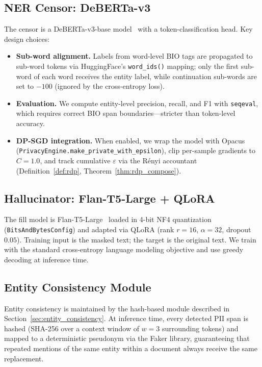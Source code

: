 \documentclass[11pt, a4paper]{article}
\begin{document}
\subsection{NER Censor: DeBERTa-v3}

The censor is a DeBERTa-v3-base model~\cite{he2021debertav3} with a
token-classification head.  Key design choices:
\begin{itemize}
  \item \textbf{Sub-word alignment.}  Labels from word-level BIO tags
        are propagated to sub-word tokens via HuggingFace's
        \texttt{word\_ids()} mapping; only the first sub-word of each
        word receives the entity label, while continuation sub-words
        are set to $-100$ (ignored by the cross-entropy loss).
  \item \textbf{Evaluation.}  We compute entity-level precision, recall,
        and F1 with \texttt{seqeval}, which requires correct BIO span
        boundaries---stricter than token-level accuracy.
  \item \textbf{DP-SGD integration.}  When enabled, we wrap the model
        with Opacus~\cite{opacus2021}
        (\texttt{PrivacyEngine.make\_private\_with\_epsilon}),
        clip per-sample gradients to $C=1.0$, and track cumulative
        $\varepsilon$ via the R\'{e}nyi accountant (Definition~\ref{def:rdp},
        Theorem~\ref{thm:rdp_compose}).
\end{itemize}

\subsection{Hallucinator: Flan-T5-Large + QLoRA}

The fill model is Flan-T5-Large~\cite{dettmers2023qlora} loaded in 4-bit
NF4 quantization (\texttt{BitsAndBytesConfig}) and adapted via QLoRA
(rank $r{=}16$, $\alpha{=}32$, dropout $0.05$).  Training input is the
masked text; the target is the original text.  We train with the standard
cross-entropy language modeling objective and use greedy decoding at
inference time.

\subsection{Entity Consistency Module}

Entity consistency is maintained by the hash-based module described in
Section~\ref{sec:entity_consistency}.  At inference time, every detected PII span
is hashed (SHA-256 over a context window of $w{=}3$ surrounding tokens)
and mapped to a deterministic pseudonym via the Faker library, guaranteeing
that repeated mentions of the same entity within a document always receive
the same replacement.
\end{document}
